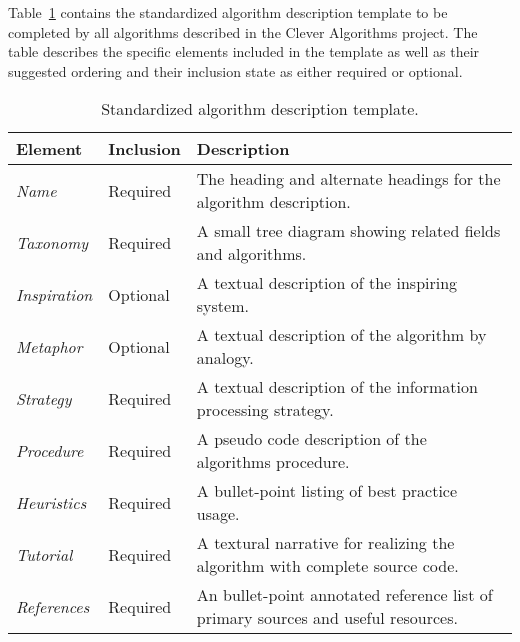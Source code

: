 \documentclass[a4paper, 11pt]{article}
\begin{document}
Table~\ref{tab:template} contains the standardized algorithm description template to be completed by all algorithms described in the Clever Algorithms project. The table describes the specific elements included in the template as well as their suggested ordering and their inclusion state as either required or optional. 

\begin{table}[ht]
	\centering
		\begin{tabularx}{\textwidth}{llX}
		\toprule
		\textbf{Element} & \textbf{Inclusion} &\textbf{Description} \\ 
		\toprule
		\emph{Name} & Required & The heading and alternate headings for the algorithm description.  \\ 
		\midrule
		\emph{Taxonomy} & Required & A small tree diagram showing related fields and algorithms. \\
		\midrule
		\emph{Inspiration} & Optional & A textual description of the inspiring system. \\
		\midrule
		\emph{Metaphor} & Optional & A textual description of the algorithm by analogy. \\
		\midrule
		\emph{Strategy} & Required & A textual description of the information processing strategy. \\
		\midrule
		\emph{Procedure} & Required & A pseudo code description of the algorithms procedure. \\
		\midrule
		\emph{Heuristics} & Required & A bullet-point listing of best practice usage. \\
		\midrule
		\emph{Tutorial} & Required & A textural narrative for realizing the algorithm with complete source code. \\
		\midrule
		\emph{References} & Required & An bullet-point annotated reference list of primary sources and useful resources. \\
		\bottomrule
		\end{tabularx}	
	\caption{Standardized algorithm description template.}
	\label{tab:template}
\end{table}
\end{document}
